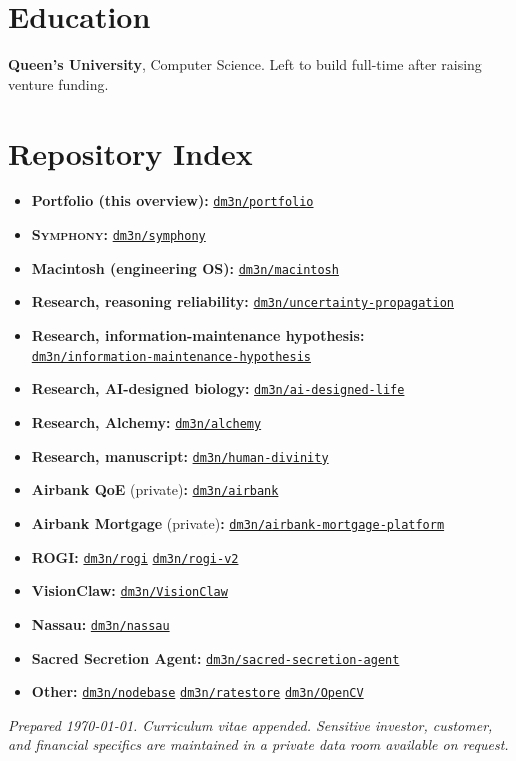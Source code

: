 \documentclass[11pt]{article}
\theoremstyle{plain}
\theoremstyle{definition}
\newcommand{\repo}[1]{\href{https://github.com/dm3n/#1}{\nolinkurl{dm3n/#1}}}
\begin{document}
\section{Education}
\textbf{Queen's University}, Computer Science. Left to build full-time after raising
venture funding.

\section*{Repository Index}
\begin{itemize}
  \item \textbf{Portfolio (this overview):} \repo{portfolio}
  \item \textbf{\textsc{Symphony}:} \repo{symphony}
  \item \textbf{Macintosh (engineering OS):} \repo{macintosh}
  \item \textbf{Research, reasoning reliability:} \repo{uncertainty-propagation}
  \item \textbf{Research, information-maintenance hypothesis:}\\
    \repo{information-maintenance-hypothesis}
  \item \textbf{Research, AI-designed biology:} \repo{ai-designed-life}
  \item \textbf{Research, Alchemy:} \repo{alchemy}
  \item \textbf{Research, manuscript:} \repo{human-divinity}
  \item \textbf{Airbank QoE} (private)\textbf{:} \repo{airbank}
  \item \textbf{Airbank Mortgage} (private)\textbf{:} \repo{airbank-mortgage-platform}
  \item \textbf{ROGI:} \repo{rogi} \;\textbar\; \repo{rogi-v2}
  \item \textbf{VisionClaw:} \repo{VisionClaw}
  \item \textbf{Nassau:} \repo{nassau}
  \item \textbf{Sacred Secretion Agent:} \repo{sacred-secretion-agent}
  \item \textbf{Other:} \repo{nodebase} \;\textbar\; \repo{ratestore} \;\textbar\; \repo{OpenCV}
\end{itemize}

\vspace{6pt}
\noindent\footnotesize\textit{Prepared \today. Curriculum vitae appended. Sensitive investor,
customer, and financial specifics are maintained in a private data room available on request.}
\end{document}
